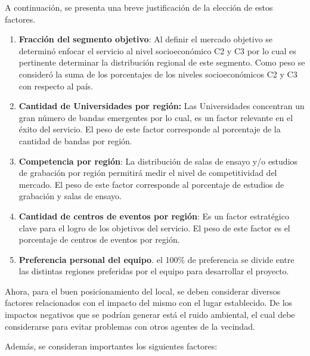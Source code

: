 A continuación, se presenta una breve justificación de la elección de estos factores.

\begin{enumerate}
	\item \textbf{Fracción del segmento objetivo}: Al definir el mercado objetivo
	se determinó enfocar el servicio al nivel socioeconómico C2 y C3 por lo cual
	es pertinente determinar la distribución regional de este segmento. Como peso se 
	consideró la suma de los porcentajes de los niveles socioeconómicos C2 y C3 con respecto
	al país.
	\item \textbf{Cantidad de Universidades por región:} Las Universidades concentran un gran
	número de bandas emergentes por lo cual, es un factor relevante en el éxito del servicio.
	El peso de este factor corresponde al porcentaje de la cantidad de bandas por región.
	\item \textbf{Competencia por región}: La distribución de salas de ensayo y/o estudios de grabación 
	por región permitirá medir el nivel de competitividad del mercado. El peso de este factor
	corresponde al porcentaje de estudios de grabación y salas de ensayo.
	\item \textbf{Cantidad de centros de eventos por región}: Es un factor estratégico clave para 
	el logro de los objetivos del servicio. El peso de este factor es el porcentaje de centros de eventos
	por región.
	\item \textbf{Preferencia personal del equipo}. el 100\% de preferencia se divide entre las distintas regiones
	preferidas por el equipo para desarrollar el proyecto.
\end{enumerate}

Ahora, para el buen posicionamiento del local, se deben considerar diversos
factores relacionados con el impacto del mismo con el lugar establecido.
De los impactos negativos que se podrían generar está el ruido ambiental, el
cual debe considerarse para evitar problemas con otros agentes de la vecindad.

Además, se consideran importantes los siguientes factores:

